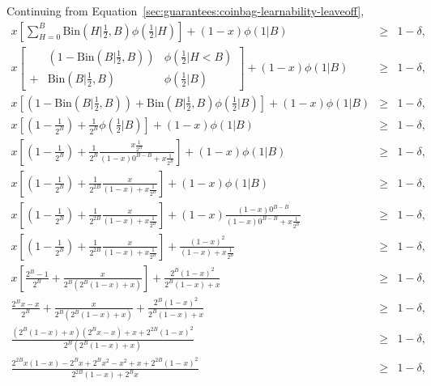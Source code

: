 \begin{example}

Continuing from Equation~\ref{sec:guarantees:coinbag-learnability-leaveoff},
\begin{eqnarray}
x
\left[
 \sum_{H=0}^B
  \mbox{Bin}(H|\frac 1 2,B)
 \phi(\frac 1 2|H)
\right]
+(1-x)
\phi(1|B)
&\geq& 1-\delta,\\
%
x
\left[
\begin{array}{lll}
 &(1-\mbox{Bin}(B|\frac 1 2, B))& \phi(\frac 1 2|H<B)\\
 +&\mbox{Bin}(B|\frac 1 2, B)& \phi(\frac 1 2|B)
\end{array}
\right]
+(1-x)
\phi(1|B)
&\geq& 1-\delta,\\
%
x
\left[
 (1-\mbox{Bin}(B|\frac 1 2, B))
 +\mbox{Bin}(B|\frac 1 2, B) \phi(\frac 1 2|B)
\right]
+(1-x)
\phi(1|B)
&\geq& 1-\delta,\\
%
x
\left[
 \left(1-\frac 1 {2^B}\right)
 +\frac 1 {2^B} \phi(\frac 1 2|B)
\right]
+(1-x)
\phi(1|B)
&\geq& 1-\delta,\\
%
x
\left[
 \left(1-\frac 1 {2^B}\right)
 +\frac 1 {2^B} \frac
{x \frac 1 {2^B}}
{(1-x)0^{B-B}+x \frac 1 {2^B}}
\right]
+(1-x)
\phi(1|B)
&\geq& 1-\delta,\\
%
x
\left[
 \left(1-\frac 1 {2^B}\right)
 +\frac 1 {2^{2B}} \frac
{x }
{(1-x)+x \frac 1 {2^B}}
\right]
+(1-x)
\phi(1|B)
&\geq& 1-\delta,\\
%
x
\left[
 \left(1-\frac 1 {2^B}\right)
 +\frac 1 {2^{2B}} \frac
{x }
{(1-x)+x \frac 1 {2^B}}
\right]
+(1-x)
\frac
{(1-x)0^{B-B}}
{(1-x)0^{B-B}+x \frac 1 {2^B}}
&\geq& 1-\delta,\\
%
x
\left[
 \left(1-\frac 1 {2^B}\right)
 +\frac 1 {2^{2B}} \frac
{x }
{(1-x)+x \frac 1 {2^B}}
\right]
+
\frac
{(1-x)^2}
{(1-x)+x \frac 1 {2^B}}
&\geq& 1-\delta,\\
%
x
\left[
 \frac {2^B-1} {2^B}
 +\frac
   {x}
   {2^B(2^B(1-x)+x)}
\right]
+
\frac
 {2^B (1-x)^2}
 {2^B (1-x)+x}
&\geq& 1-\delta,\\
%
 \frac
  {2^Bx-x}
  {2^B}
 +
 \frac
  {x}
  {2^B(2^B(1-x)+x)}
 +
 \frac
  {2^B (1-x)^2}
  {2^B (1-x)+x}
&\geq& 1-\delta,\\
%
 \frac
  {(2^B (1-x)+x)(2^Bx-x)
   +{x}
   +{2^{2B} (1-x)^2}}
  {2^B(2^B(1-x)+x)}
&\geq& 1-\delta,\\
%
 \frac
  {2^{2B}x (1-x)-2^Bx+2^Bx^2-x^2
   +{x}
   +{2^{2B} (1-x)^2}}
  {2^{2B}(1-x)+2^Bx}
&\geq& 1-\delta,\\

\end{eqnarray}
\end{example}
